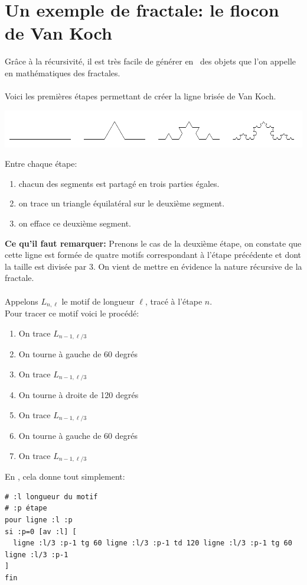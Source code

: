 \section{Un exemple de fractale: le flocon de Van Koch}
\noindent Grâce à la récursivité, il est très facile de générer en \logo\ des objets que l'on appelle  en mathématiques des fractales. \\ \\
Voici les premières étapes permettant de créer la ligne brisée de Van Koch. 
\begin{center}
\includegraphics[width=\textwidth]{images/koch0123.png}
\end{center}
Entre chaque étape:
\begin{enumerate}
 \item chacun des segments est partagé en trois parties égales.
 \item on trace un triangle équilatéral sur le deuxième segment.
 \item on efface ce deuxième segment.
\end{enumerate}
\textbf{Ce qu'il faut remarquer:}  Prenons le cas de la deuxième étape, on constate que cette ligne est formée de quatre motifs correspondant à l'étape précédente et dont la taille est divisée par 3. On vient de mettre en évidence la nature récursive de la fractale.\\ \\
Appelons $L_{n,\ell}$ le motif de longueur $\ell$, tracé à l'étape $n$.\\
Pour tracer ce motif voici le procédé:
\begin{enumerate}
 \item On trace $L_{n-1,\ell/3}$
 \item On tourne à gauche de 60 degrés
 \item On trace $L_{n-1,\ell/3}$
 \item On tourne à droite de 120 degrés
 \item On trace $L_{n-1,\ell/3}$
 \item On tourne à gauche de 60 degrés
 \item On trace $L_{n-1,\ell/3}$
\end{enumerate}
En \logo, cela donne tout simplement:
\begin{verbatim}
# :l longueur du motif
# :p étape
pour ligne :l :p
si :p=0 [av :l] [
  ligne :l/3 :p-1 tg 60 ligne :l/3 :p-1 td 120 ligne :l/3 :p-1 tg 60 ligne :l/3 :p-1
]
fin
\end{verbatim}
